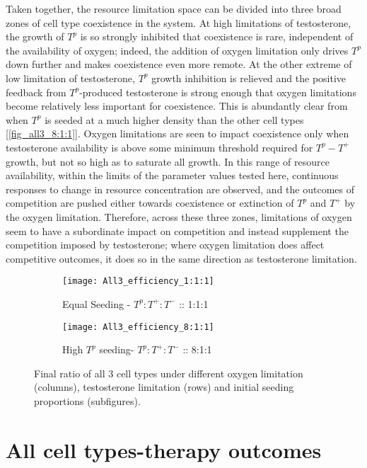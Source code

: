 Taken together, the resource limitation space can be divided into three broad zones of cell type coexistence in the system. At high limitations of testosterone, the growth of $T^p$ is so strongly inhibited that coexistence is rare, independent of the availability of oxygen; indeed, the addition of oxygen limitation only drives $T^p$ down further and makes coexistence even more remote. At the other extreme of low limitation of testosterone, $T^p$ growth inhibition is relieved and the positive feedback from $T^p$-produced testosterone is strong enough that oxygen limitations become relatively less important for coexistence. This is abundantly clear from when $T^p$ is seeded at a much higher density than the other cell types [\autoref{fig_all3_8:1:1}]. Oxygen limitations are seen to impact coexistence only when testosterone availability is above some minimum threshold required for $T^p - T^+$ growth, but not so high as to saturate all growth. In this range of resource availability, within the limits of the parameter values tested here, continuous responses to change in resource concentration are observed, and the outcomes of competition are pushed either towards coexistence or extinction of $T^p$ and $T^+$ by the oxygen limitation. Therefore, across these three zones, limitations of oxygen seem to have a subordinate impact on competition and instead supplement the competition imposed by testosterone; where oxygen limitation does affect competitive outcomes, it does so in the same direction as testosterone limitation.

\begin{figure}[h!]
  \centering
  \begin{subfigure}[b]{\textwidth}
    \centering
    \texttt{[image: All3\_efficiency\_1:1:1]}
    \caption{Equal Seeding - $T^p:T^+:T^-$ :: 1:1:1 }
    \label{fig_all3_1:1:1}
  \end{subfigure}
  \begin{subfigure}[b]{\textwidth}
    \centering
    \texttt{[image: All3\_efficiency\_8:1:1]}
    \caption{High $T^p$ seeding- $T^p:T^+:T^-$ :: 8:1:1}
    \label{fig_all3_8:1:1}
  \end{subfigure}
  \caption[Final ratio of all 3 cell types under different limitations]{Final ratio of all 3 cell types under different oxygen limitation (columns), testosterone limitation (rows) and initial seeding proportions (subfigures).}
  \label{fig_all3}
\end{figure}

\chapter{All cell types-therapy outcomes}
